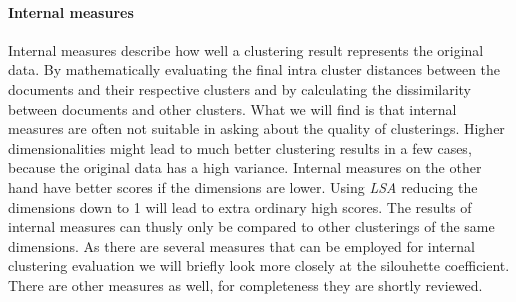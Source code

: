     \paragraph{Internal measures}
      Internal measures describe how well a clustering result represents the original data. By mathematically evaluating the final intra cluster distances between the documents and their respective clusters and by calculating the dissimilarity between documents and other clusters. What we will find is that internal measures are often not suitable in asking about the quality of clusterings. Higher dimensionalities might lead to much better clustering results in a few cases, because the original data has a high variance. Internal measures on the other hand have better scores if the dimensions are lower. Using \emph{LSA} reducing the dimensions down to 1 will lead to extra ordinary high scores. The results of internal measures can thusly only be compared to other clusterings of the same dimensions. As there are several measures that can be employed for internal clustering evaluation we will briefly look more closely at the silouhette coefficient. There are other measures as well, for completeness they are shortly reviewed.

